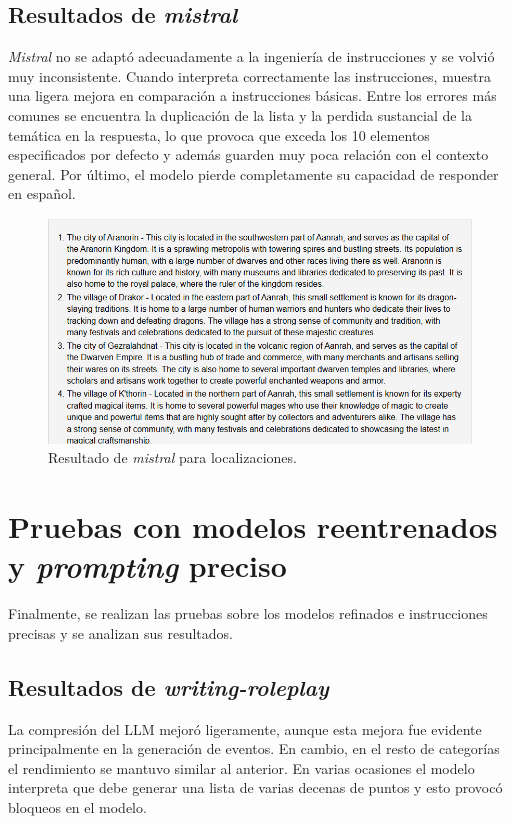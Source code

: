\subsection{Resultados de \textit{mistral}}
\textit{Mistral} no se adaptó adecuadamente a la ingeniería de instrucciones y 
se volvió muy inconsistente.
Cuando interpreta correctamente las instrucciones,
muestra una ligera mejora en comparación a instrucciones básicas.
Entre los errores más comunes se encuentra la duplicación de la lista y
la perdida sustancial de la temática en la respuesta,
lo que provoca que exceda los 10 elementos especificados por defecto
y además guarden muy poca relación con el contexto general.
Por último, el modelo pierde completamente su capacidad de responder en español.

\begin{figure}[htbp]
	\centering
	\includegraphics[width=1\textwidth]{./Figures/mistral-prompt-locations.png}
	\caption{Resultado de \textit{mistral} para localizaciones.}
	\label{fig:mistral-prompt-locations}
\end{figure}

\section{Pruebas con modelos reentrenados y \textit{prompting} preciso}
Finalmente, se realizan las pruebas sobre los modelos refinados e instrucciones precisas
y se analizan sus resultados.
\subsection{Resultados de \textit{writing-roleplay}}
La compresión del LLM mejoró ligeramente,
aunque esta mejora fue evidente principalmente en la generación de eventos.
En cambio, en el resto de categorías el rendimiento se mantuvo similar al anterior.
En varias ocasiones el modelo interpreta que debe generar una lista de varias decenas de puntos
y esto provocó bloqueos en el modelo.

